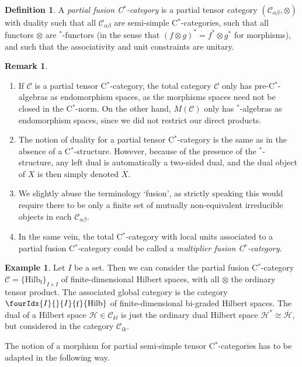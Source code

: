 \documentclass[10pt]{article}
\DeclareMathOperator{\fin}{\mathrm{f}}
\newcommand{\Hsp}{\mathcal{H}}
\newcommand{\CatC}{\mathcal{C}}
\newcommand{\CatCC}{\mathscr{C}}
\newcommand{\Hilb}{\mathrm{Hilb}}
\newcommand{\Hilbif}{\Gr{\mathrm{Hilb}}{I}{I}{}{\fin}}
\newcommand{\Gr}[5]{\fourIdx{#2}{#4}{#3}{#5}{#1}}%
\theoremstyle{definition}
\newtheorem{Def}[Theorem]{Definition}
\newtheorem{Rem}[Theorem]{Remark}
\newtheorem{Exa}[Theorem]{Example}
\numberwithin{equation}{section}
\begin{document}
\begin{Def} A \emph{partial fusion C$^*$-category} is a partial tensor category $(\CatC_{\alpha\beta},\otimes)$ with duality such that all $\CatC_{\alpha\beta}$ are semi-simple C$^*$-categories, such that all functors $\otimes$ are $^*$-functors (in the sense that $(f\otimes g)^* = f^*\otimes g^*$ for morphisms), and such that the associativity and unit constraints are unitary.
\end{Def} 

\begin{Rem}
\begin{enumerate}
\item If $\CatCC$ is a partial tensor C$^*$-category, the total category $\CatC$ only has pre-C$^*$-algebras as endomorphism spaces, as the morphisms spaces need not be closed in the C$^*$-norm. On the other hand, $M(\CatC)$ only has $^*$-algebras as endomorphism spaces, since we did not restrict our direct products. 
\item The notion of duality for a partial tensor C$^*$-category is the same as in the absence of a C$^*$-structure. However, because of the presence of the $^*$-structure, any left dual is automatically a two-sided dual, and the dual object of $X$ is then simply denoted $\overline{X}$.  
\item We slightly abuse the terminology `fusion', as strictly speaking this would require there to be only a finite set of mutually non-equivalent irreducible objects in each $\CatC_{\alpha\beta}$.
\item In the same vein, the total C$^*$-category with local units associated to a partial fusion C$^*$-category could be called a \emph{multiplier fusion C$^*$-category}.
\end{enumerate}
\end{Rem}

\begin{Exa} Let $I$ be a set. Then we can consider the partial fusion C$^*$-category $\CatCC = \{\Hilb_{\fin}\}_{I\times I}$ of finite-dimensional Hilbert spaces, with all $\otimes$ the ordinary tensor product. The associated global category is the category $\Hilbif$ of finite-dimensional bi-graded Hilbert spaces. The dual of a Hilbert space $\Hsp \in \CatC_{kl}$ is just the ordinary dual Hilbert space $\Hsp^* \cong \overline{\Hsp}$, but considered in the category $\CatC_{lk}$. 
\end{Exa}

The notion of a morphism for partial semi-simple tensor C$^*$-categories has to be adapted in the following way.
\end{document}
